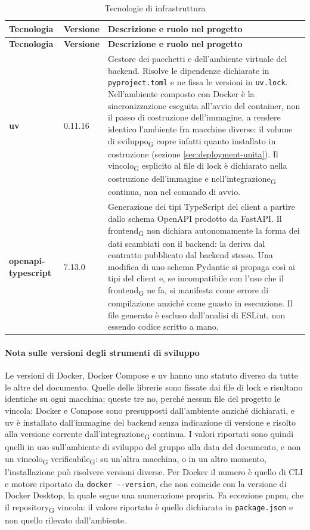 \documentclass[a4paper, 10pt]{article}
\newcommand{\vUv}{0.11.16}
\newenvironment{tabellatec}[2]{%
  \begingroup
  \small
  \setlength{\tabcolsep}{4pt}
  \begin{longtable}{|p{2.8cm}|p{1.5cm}|p{9.2cm}|}
    \caption{#1}\label{#2}\\
    \hline
    \textbf{Tecnologia} & \textbf{Versione} & \textbf{Descrizione e ruolo nel progetto} \\
    \hline
    \endfirsthead
    \hline
    \textbf{Tecnologia} & \textbf{Versione} & \textbf{Descrizione e ruolo nel progetto} \\
    \hline
    \endhead
}{%
  \end{longtable}
  \endgroup
}
\begin{document}
\begin{tabellatec}{Tecnologie di infrastruttura}{tab:tec-infrastruttura}
    \textbf{uv} & \vUv & Gestore dei pacchetti e dell'ambiente virtuale del backend. Risolve le dipendenze dichiarate in \texttt{pyproject.toml} e ne fissa le versioni in \texttt{uv.lock}. Nell'ambiente composto con Docker è la sincronizzazione eseguita all'avvio del container, non il passo di costruzione dell'immagine, a rendere identico l'ambiente fra macchine diverse: il volume di sviluppo\textsubscript{G} copre infatti quanto installato in costruzione (sezione \ref{sec:deployment-unita}). Il vincolo\textsubscript{G} esplicito al file di lock è dichiarato nella costruzione dell'immagine e nell'integrazione\textsubscript{G} continua, non nel comando di avvio. \\ \hline

    \textbf{openapi-\newline typescript} & 7.13.0 & Generazione dei tipi TypeScript del client a partire dallo schema OpenAPI prodotto da FastAPI. Il frontend\textsubscript{G} non dichiara autonomamente la forma dei dati scambiati con il backend: la deriva dal contratto pubblicato dal backend stesso. Una modifica di uno schema Pydantic si propaga così ai tipi del client e, se incompatibile con l'uso che il frontend\textsubscript{G} ne fa, si manifesta come errore di compilazione anziché come guasto in esecuzione. Il file generato è escluso dall'analisi di ESLint, non essendo codice scritto a mano. \\ \hline
\end{tabellatec}

\paragraph{Nota sulle versioni degli strumenti di sviluppo}
Le versioni di Docker, Docker Compose e uv hanno uno statuto diverso da tutte le altre del documento. Quelle delle librerie sono fissate dai file di lock e risultano identiche su ogni macchina; queste tre no, perché nessun file del progetto le vincola: Docker e Compose sono presupposti dall'ambiente anziché dichiarati, e uv è installato dall'immagine del backend senza indicazione di versione e risolto alla versione corrente dall'integrazione\textsubscript{G} continua. I valori riportati sono quindi quelli in uso sull'ambiente di sviluppo del gruppo alla data del documento, e non un vincolo\textsubscript{G} verificabile\textsubscript{G}: su un'altra macchina, o in un altro momento, l'installazione può risolvere versioni diverse. Per Docker il numero è quello di CLI e motore riportato da \texttt{docker -{}-version}, che non coincide con la versione di Docker Desktop, la quale segue una numerazione propria. Fa eccezione pnpm, che il repository\textsubscript{G} vincola: il valore riportato è quello dichiarato in \texttt{package.json} e non quello rilevato dall'ambiente.
\end{document}
